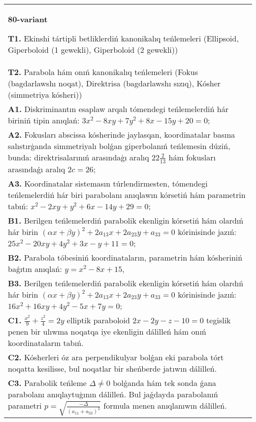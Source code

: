 \documentclass{article}
\begin{document}
\begin{tabular}{m{17cm}}
\textbf{80-variant}
\newline

\textbf{T1.} Ekinshi tártipli betliklerdiń kanonikalıq teńlemeleri (Ellipsoid, Giperboloid (1 gewekli), Giperboloid (2 gewekli)) \\
\textbf{T2.} Parabola hám onıń kanonikalıq teńlemeleri (Fokus (bagdarlawshı noqat), Direktrisa (bagdarlawshı sızıq), Kósher (simmetriya kósheri)) \\
\textbf{A1.} Diskriminantın esaplaw arqalı tómendegi teńlemelerdiń hár biriniń tipin anıqlań: $3 x^2-8 x y+7 y^2+8 x-15 y+20=0$; \\
\textbf{A2.} Fokusları abscissa kósherinde jaylasqan, koordinatalar basına salıstırģanda simmetriyalı bolǵan giperbolanıń teńlemesin dúziń, bunda: direktrisalarınıń arasındaģı aralıq $22 \frac{2}{13}$ hám fokusları arasındaǵı aralıq $2 c=26$; \\
\textbf{A3.} Koordinatalar sistemasın túrlendirmesten, tómendegi teńlemelerdiń hár biri parabolanı anıqlawın kórsetiń hám parametrin tabıń: $x^2-2 x y+y^2+6 x-14 y+29=0$; \\
\textbf{B1.} Berilgen teńlemelerdiń parabolik ekenligin kórsetiń hám olardıń hár birin $(\alpha x+\beta y)^2+2 a_{13} x+2 a_{23} y+a_{33}=0$ kórinisinde jazıń: $25 x^2-20 x y+4 y^2+3 x-y+11=0$; \\
\textbf{B2.} Parabola tóbesiniń koordinataların, parametrin hám kósheriniń baǵıtın anıqlań: $y=x^2-8 x+15$, \\
\textbf{B3.} Berilgen teńlemelerdiń parabolik ekenligin kórsetiń hám olardıń hár birin $(\alpha x+\beta y)^2+2 a_{13} x+2 a_{23} y+a_{33}=0$ kórinisinde jazıń:  $16 x^2+16 x y+4 y^2-5 x+7 y=0$; \\
\textbf{C1.} $\frac{x^2}{9}+\frac{z^2}{4}=2 y$ elliptik paraboloid $2 x-2 y-z-10=0$ tegislik penen bir ulıwma noqatqa iye ekenligin dálilleń hám onıń koordinataların tabıń. \\
\textbf{C2.} Kósherleri óz ara perpendikulyar bolǵan eki parabola tórt noqatta kesilisse, bul noqatlar bir sheńberde jatıwın dálilleń. \\
\textbf{C3.} Parabolik teńleme $\Delta \neq 0$ bolǵanda hám tek sonda ǵana parabolanı anıqlaytuģının dálilleń. Bul jaǵdayda parabolanıń parametri $p=\sqrt{\frac{-\Delta}{ (a_{11}+a_{33}) ^3}}$ formula menen anıqlanıwın dálilleń. \\

\end{tabular}
\vspace{1cm}
\end{document}
